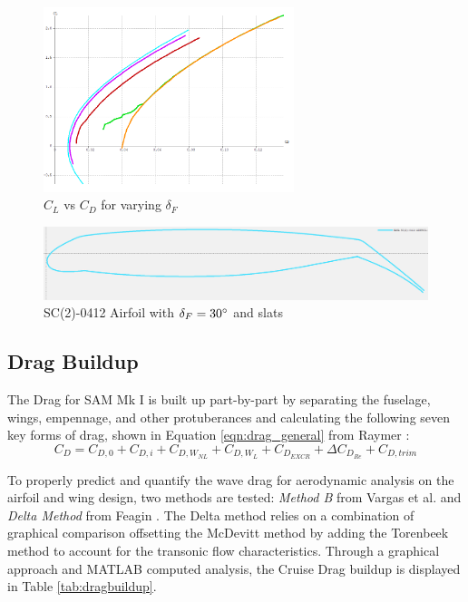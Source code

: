 \begin{figure}[!h]
    \centering
    \includegraphics[width=0.65\textwidth]{Photos/aero/CL_o_CD.png}
    \caption{$C_L$ vs $C_D$ for varying $\delta_F$}
    \label{fig:clcdhigh}
\end{figure}

\begin{figure}[!h]
    \centering
    \includegraphics[width=\textwidth]{Photos/aero/sc0412flapped.png}
    \caption{SC(2)-0412 Airfoil with $\delta_F = 30\degree$ and slats}
    \label{fig:highlift}
\end{figure}

\clearpage
\subsection{Drag Buildup}
The Drag for SAM Mk I is built up part-by-part by separating the fuselage, wings, empennage, and other protuberances and calculating the following seven key forms of drag, shown in Equation \ref{eqn:drag_general} from Raymer \cite{raymer}:
\begin{equation}\label{eqn:drag_general}
    C_D = C_{D,0} + C_{D,i} + C_{D,W_{NL}} + C_{D,W_{L}} + C_{D_{EXCR}} + \Delta C_{D_{Re}} + C_{D,trim}
\end{equation}

To properly predict and quantify the wave drag for aerodynamic analysis on the airfoil and wing design, two methods are tested: \textit{Method B} from Vargas et al. \cite{vargas} and \textit{Delta Method} from Feagin \cite{deltaMethod}.  The Delta method relies on a combination of graphical comparison offsetting the McDevitt method \cite{mcdevitt} by adding the Torenbeek method \cite{torenbeek} to account for the transonic flow characteristics.  Through a graphical approach and MATLAB computed analysis, the Cruise Drag buildup is displayed in Table \ref{tab:dragbuildup}.

